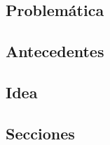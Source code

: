 


\subsection{Problemática}


\subsection{Antecedentes}


\subsection{Idea}

\subsection{Secciones}
